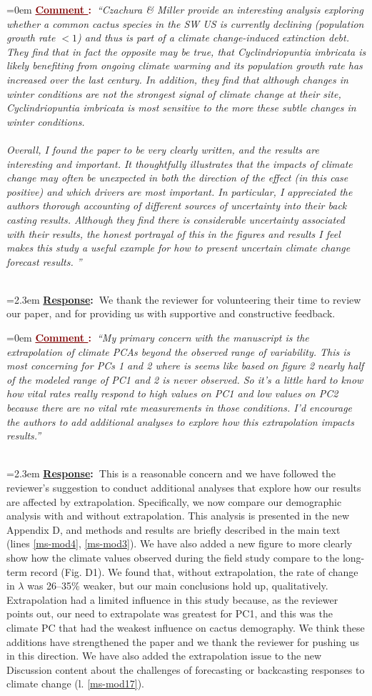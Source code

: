 \documentclass[12pt]{article}
\newcounter{cN}
\newcommand{\comment}[1]{
	\vspace{2em}
	\refstepcounter{cN} %
	\noindent \hangindent=0em \textbf{\textcolor{Maroon}{\uline{Comment \thecN}:~}}\emph{``#1''}
	}
\newcommand{\response}[1]{
	\\[0.25em]
	\hangindent=2.3em \textbf{\textcolor{NavyBlue}{\uline{Response}:~}}#1
	}
\begin{document}
\comment{Czachura \& Miller provide an interesting analysis exploring whether a common cactus species in the SW US is currently declining (population growth rate $<1$) and thus is part of a climate change-induced extinction debt. They find that in fact the opposite may be true, that Cyclindriopuntia imbricata is likely benefiting from ongoing climate warming and its population growth rate has increased over the last century. In addition, they find that although changes in winter conditions are not the strongest signal of climate change at their site, Cyclindriopuntia imbricata is most sensitive to the more these subtle changes in winter conditions. 
\\
\\
Overall, I found the paper to be very clearly written, and the results are interesting and important. It thoughtfully illustrates that the impacts of climate change may often be unexpected in both the direction of the effect (in this case positive) and which drivers are most important.  In particular, I appreciated the authors thorough accounting of different sources of uncertainty into their back casting results. Although they find there is considerable uncertainty associated with their results, the honest portrayal of this in the figures and results I feel makes this study a useful example for how to present uncertain climate change forecast results. 
}
\response{We thank the reviewer for volunteering their time to review our paper, and for providing us with supportive and constructive feedback.}

\comment{My primary concern with the manuscript is the extrapolation of climate PCAs beyond the observed range of variability. This is most concerning for PCs 1 and 2 where is seems like based on figure 2 nearly half of the modeled range of PC1 and 2 is never observed. So it’s a little hard to know how vital rates really respond to high values on PC1 and low values on PC2 because there are no vital rate measurements in those conditions. I’d encourage the authors to add additional analyses to explore how this extrapolation impacts results.}
\response{This is a reasonable concern and we have followed the reviewer's suggestion to conduct additional analyses that explore how our results are affected by extrapolation.
Specifically, we now compare our demographic analysis with and without  extrapolation.
This analysis is presented in the new Appendix D, and methods and results are briefly described in the main text (lines \ref{ms-mod4}, \ref{ms-mod3}).
We have also added a new figure to more clearly show how the climate values observed during the field study compare to the long-term record (Fig. D1). 
We found that, without extrapolation, the rate of change in $\lambda$ was 26--35\% weaker, but our main conclusions hold up, qualitatively. 
Extrapolation had a limited influence in this study because, as the reviewer points out, our need to extrapolate was greatest for PC1, and this was the climate PC that had the weakest influence on cactus demography. 
We think these additions have strengthened the paper and we thank the reviewer for pushing us in this direction.
We have also added the extrapolation issue to the new Discussion content about the challenges of forecasting or backcasting responses to climate change (l. \ref{ms-mod17}).
}
\end{document}
